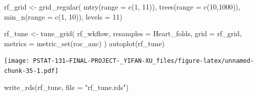 \documentclass[
]{article}
\newenvironment{Shaded}{\begin{snugshade}}{\end{snugshade}}
\newcommand{\AttributeTok}[1]{\textcolor[rgb]{0.77,0.63,0.00}{#1}}
\newcommand{\DecValTok}[1]{\textcolor[rgb]{0.00,0.00,0.81}{#1}}
\newcommand{\FunctionTok}[1]{\textcolor[rgb]{0.00,0.00,0.00}{#1}}
\newcommand{\NormalTok}[1]{#1}
\newcommand{\OtherTok}[1]{\textcolor[rgb]{0.56,0.35,0.01}{#1}}
\newcommand{\StringTok}[1]{\textcolor[rgb]{0.31,0.60,0.02}{#1}}
\begin{document}
\begin{Shaded}
\begin{Highlighting}[]
\NormalTok{rf\_grid }\OtherTok{\textless{}{-}} \FunctionTok{grid\_regular}\NormalTok{(}
  \FunctionTok{mtry}\NormalTok{(}\AttributeTok{range =} \FunctionTok{c}\NormalTok{(}\DecValTok{1}\NormalTok{, }\DecValTok{11}\NormalTok{)),}
  \FunctionTok{trees}\NormalTok{(}\AttributeTok{range =} \FunctionTok{c}\NormalTok{(}\DecValTok{10}\NormalTok{,}\DecValTok{1000}\NormalTok{)),}
  \FunctionTok{min\_n}\NormalTok{(}\AttributeTok{range =} \FunctionTok{c}\NormalTok{(}\DecValTok{1}\NormalTok{, }\DecValTok{10}\NormalTok{)),}
  \AttributeTok{levels =} \DecValTok{11}\NormalTok{)}
\end{Highlighting}
\end{Shaded}

\begin{Shaded}
\begin{Highlighting}[]
\NormalTok{rf\_tune }\OtherTok{\textless{}{-}} \FunctionTok{tune\_grid}\NormalTok{(}
\NormalTok{  rf\_wkflow,}
  \AttributeTok{resamples =}\NormalTok{ Heart\_folds,}
  \AttributeTok{grid =}\NormalTok{ rf\_grid,}
  \AttributeTok{metrics =} \FunctionTok{metric\_set}\NormalTok{(roc\_auc)}
\NormalTok{)}
\FunctionTok{autoplot}\NormalTok{(rf\_tune)}
\end{Highlighting}
\end{Shaded}

\texttt{[image: PSTAT-131--FINAL-PROJECT-\_YIFAN-XU\_files/figure-latex/unnamed-chunk-35-1.pdf]}

\begin{Shaded}
\begin{Highlighting}[]
\FunctionTok{write\_rds}\NormalTok{(rf\_tune, }\AttributeTok{file =} \StringTok{"rf\_tune.rds"}\NormalTok{)}
\end{Highlighting}
\end{Shaded}
\end{document}
